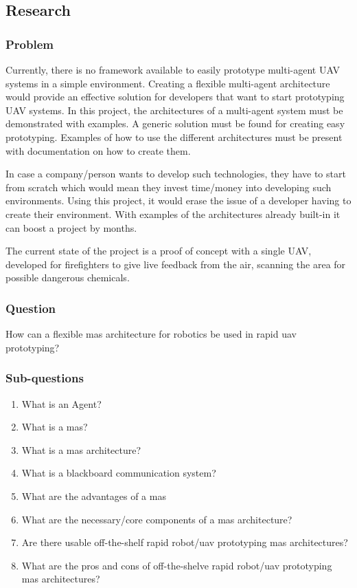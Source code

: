 \subsection{Research}
\subsubsection{Problem}

Currently, there is no framework available to easily prototype multi-agent UAV systems in a simple environment. Creating a flexible multi-agent architecture would provide an effective solution for developers that want to start prototyping UAV systems. In this project, the architectures of a multi-agent system must be demonstrated with examples. A generic solution must be found for creating easy prototyping. Examples of how to use the different architectures must be present with documentation on how to create them.

In case a company/person wants to develop such technologies, they have to start from scratch which would mean they invest time/money into developing such environments. Using this project, it would erase the issue of a developer having to create their environment. With examples of the architectures already built-in it can boost a project by months.

The current state of the project is a proof of concept with a single UAV, developed for firefighters to give live feedback from the air, scanning the area for possible dangerous chemicals.

\subsubsection{Question}

How can a flexible \acs{mas} architecture for robotics be used in rapid \acs{uav} prototyping?

\subsubsection{Sub-questions}
\begin{enumerate}
    \item What is an Agent?
    \item What is a \acs{mas}?
    \item What is a \acs{mas} architecture?
    \item What is a blackboard communication system?
    \item What are the advantages of a \acs{mas}
    \item What are the necessary/core components of a \acs{mas} architecture?
    \item Are there usable off-the-shelf rapid robot/\acs{uav} prototyping \acs{mas} architectures?
    \item What are the pros and cons of off-the-shelve rapid robot/\acs{uav} prototyping \acs{mas} architectures?
  \end{enumerate}
\newpage

